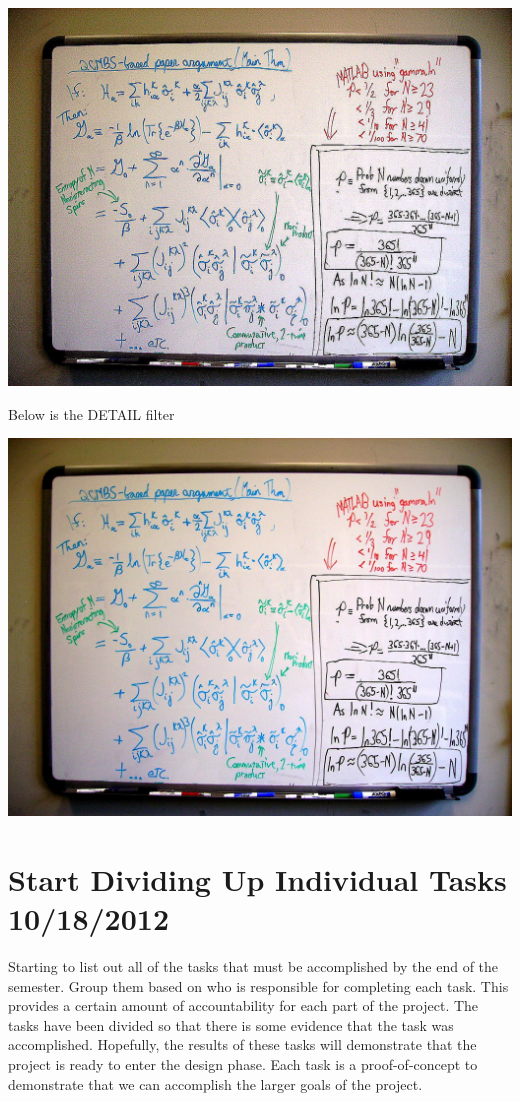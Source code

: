 \documentclass[]{article}
\begin{document}
			\includegraphics[scale=0.238]{images/python-filters/edge_enhance_more.jpg}
		
			Below is the DETAIL filter
			
			\includegraphics[scale=0.238]{images/python-filters/detail.jpg}
		
	
	\section{Start Dividing Up Individual Tasks 10/18/2012}
		Starting to list out all of the tasks that must be accomplished by the end of the semester. Group them based on who is responsible for completing each task. This provides a certain amount of accountability for each part of the project. The tasks have been divided so that there is some evidence that the task was accomplished. Hopefully, the results of these tasks will demonstrate that the project is ready to enter the design phase. Each task is a proof-of-concept to demonstrate that we can accomplish the larger goals of the project.
		
\end{document}
